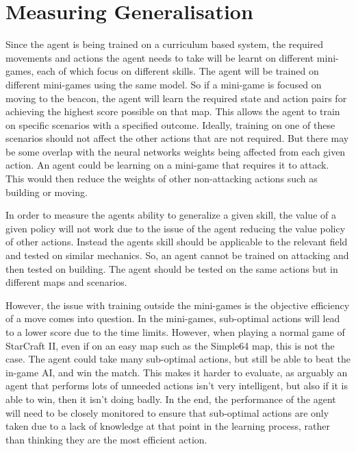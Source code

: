 \section{Measuring Generalisation}

Since the agent is being trained on a curriculum based system, the required
movements and actions the agent needs to take will be learnt on different
mini-games, each of which focus on different skills. The agent will be trained
on different mini-games using the same model. So if a mini-game is focused on
moving to the beacon, the agent will learn the required state and action pairs
for achieving the highest score possible on that map. This allows the agent to
train on specific scenarios with a specified outcome. Ideally, training on one
of these scenarios should not affect the other actions that are not required.
But there may be some overlap with the neural networks weights being affected
from each given action. An agent could be learning on a mini-game that requires
it to attack. This would then reduce the weights of other non-attacking actions
such as building or moving.

In order to measure the agents ability to generalize a given skill, the value of
a given policy will not work due to the issue of the agent reducing the value
policy of other actions. Instead the agents skill should be applicable to the
relevant field and tested on similar mechanics. So, an agent cannot be trained
on attacking and then tested on building. The agent should be tested on the same
actions but in different maps and scenarios.

However, the issue with training outside the mini-games is the objective
efficiency of a move comes into question. In the mini-games, sub-optimal actions
will lead to a lower score due to the time limits. However, when playing a
normal game of StarCraft II, even if on an easy map such as the Simple64 map,
this is not the case. The agent could take many sub-optimal actions, but still
be able to beat the in-game AI, and win the match. This makes it harder to
evaluate, as arguably an agent that performs lots of unneeded actions isn't very
intelligent, but also if it is able to win, then it isn't doing badly. In the
end, the performance of the agent will need to be closely monitored to ensure
that sub-optimal actions are only taken due to a lack of knowledge at that point
in the learning process, rather than thinking they are the most efficient
action.
